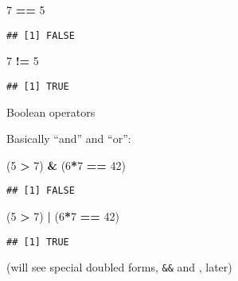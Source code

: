 \documentclass[8pt,ignorenonframetext,]{beamer}
\newenvironment{Shaded}{\begin{snugshade}}{\end{snugshade}}
\newcommand{\DecValTok}[1]{\textcolor[rgb]{0.00,0.00,0.81}{#1}}
\newcommand{\StringTok}[1]{\textcolor[rgb]{0.31,0.60,0.02}{#1}}
\newcommand{\OperatorTok}[1]{\textcolor[rgb]{0.81,0.36,0.00}{\textbf{#1}}}
\newcommand{\NormalTok}[1]{#1}
\begin{document}
\begin{frame}[fragile]{}

\begin{Shaded}
\begin{Highlighting}[]
\DecValTok{7} \OperatorTok{==}\StringTok{ }\DecValTok{5}
\end{Highlighting}
\end{Shaded}

\begin{verbatim}
## [1] FALSE
\end{verbatim}

\begin{Shaded}
\begin{Highlighting}[]
\DecValTok{7} \OperatorTok{!=}\StringTok{ }\DecValTok{5}
\end{Highlighting}
\end{Shaded}

\begin{verbatim}
## [1] TRUE
\end{verbatim}

\end{frame}

\begin{frame}[fragile]{Boolean operators}

Basically ``and'' and ``or'':

\begin{Shaded}
\begin{Highlighting}[]
\NormalTok{(}\DecValTok{5} \OperatorTok{>}\StringTok{ }\DecValTok{7}\NormalTok{) }\OperatorTok{&}\StringTok{ }\NormalTok{(}\DecValTok{6}\OperatorTok{*}\DecValTok{7} \OperatorTok{==}\StringTok{ }\DecValTok{42}\NormalTok{)}
\end{Highlighting}
\end{Shaded}

\begin{verbatim}
## [1] FALSE
\end{verbatim}

\begin{Shaded}
\begin{Highlighting}[]
\NormalTok{(}\DecValTok{5} \OperatorTok{>}\StringTok{ }\DecValTok{7}\NormalTok{) }\OperatorTok{|}\StringTok{ }\NormalTok{(}\DecValTok{6}\OperatorTok{*}\DecValTok{7} \OperatorTok{==}\StringTok{ }\DecValTok{42}\NormalTok{)}
\end{Highlighting}
\end{Shaded}

\begin{verbatim}
## [1] TRUE
\end{verbatim}

(will see special doubled forms, \texttt{\&\&} and
\texttt{\textbar{}\textbar{}}, later)

\end{frame}
\end{document}
